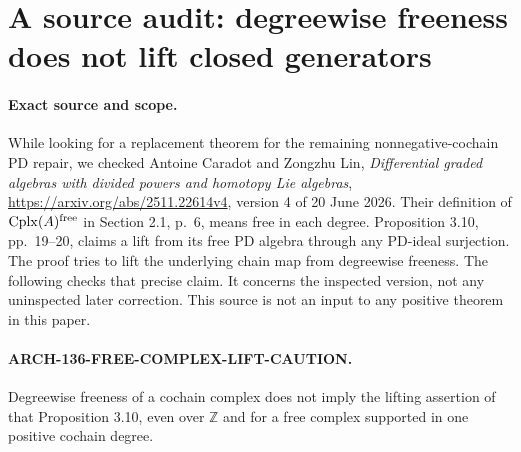 \section{A source audit: degreewise freeness does not lift closed generators}
\label{sec:136-free-complex-lifting-caution}

\paragraph{Exact source and scope.}
While looking for a replacement theorem for the remaining
nonnegative-cochain PD repair, we checked Antoine Caradot and
Zongzhu Lin, \emph{Differential graded algebras with divided
powers and homotopy Lie algebras},
\url{https://arxiv.org/abs/2511.22614v4}, version 4 of
20 June 2026. Their definition of \(\operatorname{Cplx}(A)^{\rm free}\)
in Section 2.1, p.~6, means free in each degree. Proposition 3.10,
pp.~19--20, claims a lift from its free PD algebra through any
PD-ideal surjection. The proof tries to lift the underlying
chain map from degreewise freeness. The following checks that
precise claim. It concerns the inspected version, not any
uninspected later correction. This source is not an input to
any positive theorem in this paper.

\paragraph{ARCH-136-FREE-COMPLEX-LIFT-CAUTION.}
Degreewise freeness of a cochain complex does not imply the
lifting assertion of that Proposition 3.10, even over
\(\mathbb Z\) and for a free complex supported in one
positive cochain degree.

